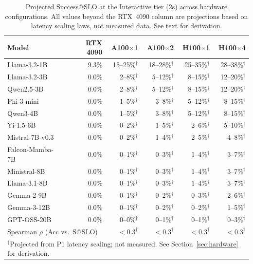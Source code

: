 \documentclass[11pt]{article}
\makeatletter
\newcommand{\sslo}{\ensuremath{\mathrm{S@SLO}}}
\makeatother
\begin{document}
\begin{table}[t]
\centering
\caption{Projected Success@SLO at the Interactive tier (2s) across hardware configurations. All values beyond the RTX~4090 column are projections based on latency scaling laws, not measured data. See text for derivation.}
\label{tab:hardware-results}
\small
\begin{tabular}{l rrrrr}
\toprule
\textbf{Model} & \textbf{RTX 4090} & \textbf{A100$\times$1} & \textbf{A100$\times$2} & \textbf{H100$\times$1} & \textbf{H100$\times$4} \\
\midrule
Llama-3.2-1B    & 9.3\%  & 15--25\%$^\dagger$ & 18--28\%$^\dagger$ & 25--35\%$^\dagger$ & 28--38\%$^\dagger$ \\
Llama-3.2-3B    & 0.0\%  & 2--8\%$^\dagger$   & 5--12\%$^\dagger$  & 8--15\%$^\dagger$  & 12--20\%$^\dagger$ \\
Qwen2.5-3B      & 0.0\%  & 2--8\%$^\dagger$   & 5--12\%$^\dagger$  & 8--15\%$^\dagger$  & 12--20\%$^\dagger$ \\
Phi-3-mini       & 0.0\%  & 1--5\%$^\dagger$   & 3--8\%$^\dagger$   & 5--12\%$^\dagger$  & 8--15\%$^\dagger$ \\
Qwen3-4B         & 0.0\%  & 1--5\%$^\dagger$   & 3--8\%$^\dagger$   & 5--12\%$^\dagger$  & 8--15\%$^\dagger$ \\
Yi-1.5-6B        & 0.0\%  & 0--2\%$^\dagger$   & 1--5\%$^\dagger$   & 2--6\%$^\dagger$   & 5--10\%$^\dagger$ \\
Mistral-7B-v0.3  & 0.0\%  & 0--2\%$^\dagger$   & 1--4\%$^\dagger$   & 2--5\%$^\dagger$   & 4--8\%$^\dagger$ \\
Falcon-Mamba-7B  & 0.0\%  & 0--1\%$^\dagger$   & 0--3\%$^\dagger$   & 1--4\%$^\dagger$   & 3--7\%$^\dagger$ \\
Ministral-8B     & 0.0\%  & 0--1\%$^\dagger$   & 0--3\%$^\dagger$   & 1--4\%$^\dagger$   & 3--7\%$^\dagger$ \\
Llama-3.1-8B     & 0.0\%  & 0--1\%$^\dagger$   & 0--3\%$^\dagger$   & 1--4\%$^\dagger$   & 3--7\%$^\dagger$ \\
Gemma-2-9B       & 0.0\%  & 0--1\%$^\dagger$   & 0--2\%$^\dagger$   & 0--3\%$^\dagger$   & 2--6\%$^\dagger$ \\
Gemma-3-12B      & 0.0\%  & 0--1\%$^\dagger$   & 0--2\%$^\dagger$   & 0--2\%$^\dagger$   & 1--5\%$^\dagger$ \\
GPT-OSS-20B      & 0.0\%  & 0--0\%$^\dagger$   & 0--1\%$^\dagger$   & 0--1\%$^\dagger$   & 0--3\%$^\dagger$ \\
\midrule
\multicolumn{2}{l}{Spearman $\rho$ (Acc vs.\ $\sslo{}$)} & ${<}0.3^\dagger$ & ${<}0.3^\dagger$ & ${<}0.3^\dagger$ & ${<}0.3^\dagger$ \\
\bottomrule
\multicolumn{6}{l}{\footnotesize $^\dagger$Projected from P1 latency scaling; not measured. See Section~\ref{sec:hardware} for derivation.}
\end{tabular}
\end{table}
\end{document}
